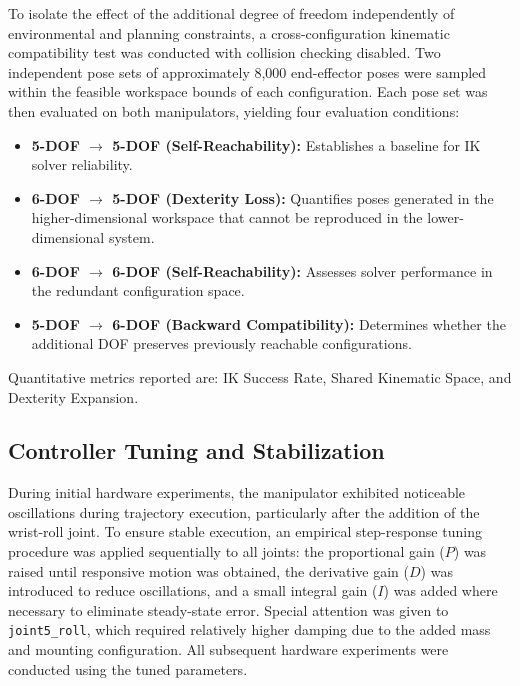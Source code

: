\documentclass[conference]{IEEEtran}
\begin{document}
	To isolate the effect of the additional degree of freedom
	independently of environmental and planning constraints, a
	cross-configuration kinematic compatibility test was conducted with
	collision checking disabled. Two independent pose sets of approximately
	8,000 end-effector poses were sampled within the feasible workspace
	bounds of each configuration. Each pose set was then evaluated on both
	manipulators, yielding four evaluation conditions:
	
	\begin{itemize}
		\item \textbf{5-DOF $\rightarrow$ 5-DOF (Self-Reachability):}
		Establishes a baseline for IK solver reliability.
		
		\item \textbf{6-DOF $\rightarrow$ 5-DOF (Dexterity Loss):}
		Quantifies poses generated in the higher-dimensional workspace
		that cannot be reproduced in the lower-dimensional system.
		
		\item \textbf{6-DOF $\rightarrow$ 6-DOF (Self-Reachability):}
		Assesses solver performance in the redundant configuration space.
		
		\item \textbf{5-DOF $\rightarrow$ 6-DOF (Backward Compatibility):}
		Determines whether the additional DOF preserves previously
		reachable configurations.
	\end{itemize}
	
	Quantitative metrics reported are: IK Success Rate, Shared Kinematic
	Space, and Dexterity Expansion.
	
	\subsection{Controller Tuning and Stabilization}
	
	During initial hardware experiments, the manipulator exhibited
	noticeable oscillations during trajectory execution, particularly after
	the addition of the wrist-roll joint. To ensure stable execution, an
	empirical step-response tuning procedure was applied sequentially to
	all joints: the proportional gain ($P$) was raised until responsive
	motion was obtained, the derivative gain ($D$) was introduced to
	reduce oscillations, and a small integral gain ($I$) was added where
	necessary to eliminate steady-state error. Special attention was given
	to \texttt{joint5\_roll}, which required relatively higher damping due
	to the added mass and mounting configuration. All subsequent hardware
	experiments were conducted using the tuned parameters.
	
\end{document}
